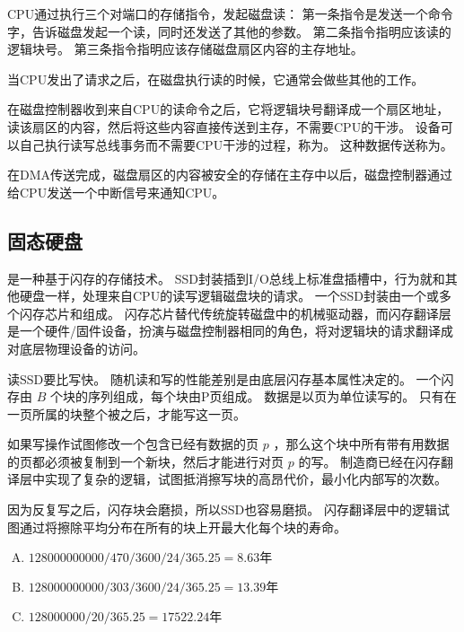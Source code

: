 {{{            CPU通过执行三个对端口的存储指令，发起磁盘读：
            第一条指令是发送一个命令字，告诉磁盘发起一个读，同时还发送了其他的参数。
            第二条指令指明应该读的逻辑块号。
            第三条指令指明应该存储磁盘扇区内容的主存地址。

            当CPU发出了请求之后，在磁盘执行读的时候，它通常会做些其他的工作。

            在磁盘控制器收到来自CPU的读命令之后，它将逻辑块号翻译成一个扇区地址，读该扇区的内容，然后将这些内容直接传送到主存，不需要CPU的干涉。
            设备可以自己执行读写总线事务而不需要CPU干涉的过程，称为。
            这种数据传送称为。

            在DMA传送完成，磁盘扇区的内容被安全的存储在主存中以后，磁盘控制器通过给CPU发送一个中断信号来通知CPU。
        }
    }

    \subsection{固态硬盘}
    {
        是一种基于闪存的存储技术。
        SSD封装插到I/O总线上标准盘插槽中，行为就和其他硬盘一样，处理来自CPU的读写逻辑磁盘块的请求。
        一个SSD封装由一个或多个闪存芯片和组成。
        闪存芯片替代传统旋转磁盘中的机械驱动器，而闪存翻译层是一个硬件/固件设备，扮演与磁盘控制器相同的角色，将对逻辑块的请求翻译成对底层物理设备的访问。

        读SSD要比写快。
        随机读和写的性能差别是由底层闪存基本属性决定的。
        一个闪存由 $B$ 个块的序列组成，每个块由P页组成。
        数据是以页为单位读写的。
        只有在一页所属的块整个被之后，才能写这一页。

        如果写操作试图修改一个包含已经有数据的页 $p$ ，那么这个块中所有带有用数据的页都必须被复制到一个新块，然后才能进行对页 $p$ 的写。
        制造商已经在闪存翻译层中实现了复杂的逻辑，试图抵消擦写块的高昂代价，最小化内部写的次数。

        因为反复写之后，闪存块会磨损，所以SSD也容易磨损。
        闪存翻译层中的逻辑试图通过将擦除平均分布在所有的块上开最大化每个块的寿命。

        \begin{practicec}
            \begin{enumerate}[A.]
                \item $128000000000 / 470 / 3600 / 24 / 365.25 = 8.63\text{年}$
                \item $128000000000 / 303 / 3600 / 24 / 365.25 = 13.39\text{年}$
                \item $128000000 / 20 / 365.25 = 17522.24\text{年}$
            \end{enumerate}
        \end{practicec}
    }

}
